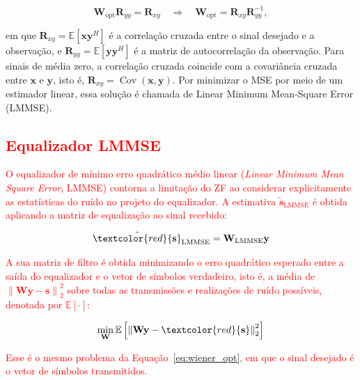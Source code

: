 \begin{equation}
\mathbf{W}_{\text{opt}}\mathbf{R}_{yy} = \mathbf{R}_{xy}
\quad\Rightarrow\quad
\mathbf{W}_{\text{opt}} = \mathbf{R}_{xy}\mathbf{R}_{yy}^{-1},
\label{eq:wiener_hopf}
\end{equation}

em que $\mathbf{R}_{xy}=\mathbb{E}[\mathbf{x}\mathbf{y}^H]$ é a correlação
cruzada entre o sinal desejado e a observação, e
$\mathbf{R}_{yy}=\mathbb{E}[\mathbf{y}\mathbf{y}^H]$ é a matriz de
autocorrelação da observação. Para sinais de média zero, a correlação
cruzada coincide com a covariância cruzada entre $\mathbf{x}$ e $\mathbf{y}$,
isto é, $\mathbf{R}_{xy}=\operatorname{Cov}(\mathbf{x},\mathbf{y})$. Por
minimizar o MSE por meio de um estimador linear, essa solução é chamada de
Linear Minimum Mean-Square Error (LMMSE).

\subsection{\texorpdfstring{\textcolor{red}{Equalizador LMMSE}}{Equalizador LMMSE}}

\textcolor{red}{O equalizador de mínimo erro quadrático médio linear (\textit{Linear Minimum Mean Square Error}, LMMSE) contorna a limitação do ZF ao considerar explicitamente as estatísticas do ruído no projeto do equalizador. A estimativa $\tilde{\mathbf{s}}_\text{LMMSE}$ é obtida aplicando a matriz de equalização ao sinal recebido:}

\begin{equation}
\tilde{\textcolor{red}{\mathbf{s}}}_\text{LMMSE}=
\mathbf{W}_\text{LMMSE}\mathbf{y}
\label{eq:lmmse_estimate}
\end{equation}


\textcolor{red}{A sua matriz de filtro é obtida minimizando o erro quadrático esperado entre a saída do equalizador e o vetor de símbolos verdadeiro, isto é, a média de $\left\|\mathbf{W}\mathbf{y}-\mathbf{s}\right\|_2^2$ sobre todas as transmissões e realizações de ruído possíveis, denotada por $\mathbb{E}\left[\cdot\right]$:}

\begin{equation}
\min_{\mathbf{W}}
\mathbb{E}
\left[
\left\|\mathbf{W}\mathbf{y}-\textcolor{red}{\mathbf{s}}\right\|_2^2
\right]
\label{eq:lmmse_opt}
\end{equation}

\textcolor{red}{Esse é o mesmo problema da Equação~{\hypersetup{linkcolor=red}\eqref{eq:wiener_opt}}, em que o sinal desejado é o vetor de símbolos transmitidos.}


